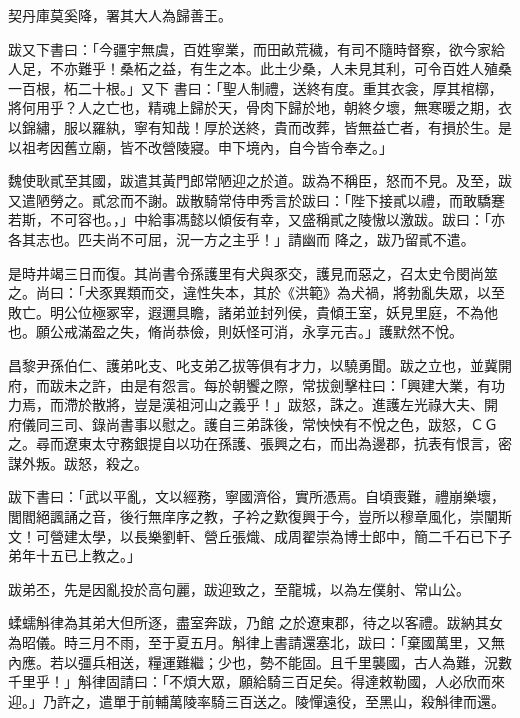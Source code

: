 \begin{pinyinscope}
 契丹庫莫奚降，署其大人為歸善王。



 跋又下書曰：「今疆宇無虞，百姓寧業，而田畝荒穢，有司不隨時督察，欲今家給人足，不亦難乎！桑柘之益，有生之本。此土少桑，人未見其利，可令百姓人殖桑一百根，柘二十根。」又下
 書曰：「聖人制禮，送終有度。重其衣衾，厚其棺槨，將何用乎？人之亡也，精魂上歸於天，骨肉下歸於地，朝終夕壞，無寒暖之期，衣以錦繡，服以羅紈，寧有知哉！厚於送終，貴而改葬，皆無益亡者，有損於生。是以祖考因舊立廟，皆不改營陵寢。申下境內，自今皆令奉之。」



 魏使耿貳至其國，跋遣其黃門郎常陋迎之於道。跋為不稱臣，怒而不見。及至，跋又遣陋勞之。貳忿而不謝。跋散騎常侍申秀言於跋曰：「陛下接貳以禮，而敢驕蹇若斯，不可容也。，」中給事馮懿以傾佞有幸，又盛稱貳之陵慠以激跋。跋曰：「亦各其志也。匹夫尚不可屈，況一方之主乎！」請幽而
 降之，跋乃留貳不遣。



 是時井竭三日而復。其尚書令孫護里有犬與豕交，護見而惡之，召太史令閔尚筮之。尚曰：「犬豕異類而交，違性失本，其於《洪範》為犬禍，將勃亂失眾，以至敗亡。明公位極冢宰，遐邇具瞻，諸弟並封列侯，貴傾王室，妖見里庭，不為他也。願公戒滿盈之失，脩尚恭儉，則妖怪可消，永享元吉。」護默然不悅。



 昌黎尹孫伯仁、護弟叱支、叱支弟乙拔等俱有才力，以驍勇聞。跋之立也，並冀開府，而跋未之許，由是有怨言。每於朝饗之際，常拔劍擊柱曰：「興建大業，有功力焉，而滯於散將，豈是漢祖河山之義乎！」跋怒，誅之。進護左光祿大夫、開
 府儀同三司、錄尚書事以慰之。護自三弟誅後，常怏怏有不悅之色，跋怒，ＣＧ之。尋而遼東太守務銀提自以功在孫護、張興之右，而出為邊郡，抗表有恨言，密謀外叛。跋怒，殺之。



 跋下書曰：「武以平亂，文以經務，寧國濟俗，實所憑焉。自頃喪難，禮崩樂壞，閭閻絕諷誦之音，後行無庠序之教，子衿之歎復興于今，豈所以穆章風化，崇闡斯文！可營建太學，以長樂劉軒、營丘張熾、成周翟崇為博士郎中，簡二千石已下子弟年十五已上教之。」



 跋弟丕，先是因亂投於高句麗，跋迎致之，至龍城，以為左僕射、常山公。



 蝚蠕斛律為其弟大但所逐，盡室奔跋，乃館
 之於遼東郡，待之以客禮。跋納其女為昭儀。時三月不雨，至于夏五月。斛律上書請還塞北，跋曰：「棄國萬里，又無內應。若以彊兵相送，糧運難繼；少也，勢不能固。且千里襲國，古人為難，況數千里乎！」斛律固請曰：「不煩大眾，願給騎三百足矣。得達敕勒國，人必欣而來迎。」乃許之，遣單于前輔萬陵率騎三百送之。陵憚遠役，至黑山，殺斛律而還。




\end{pinyinscope}
